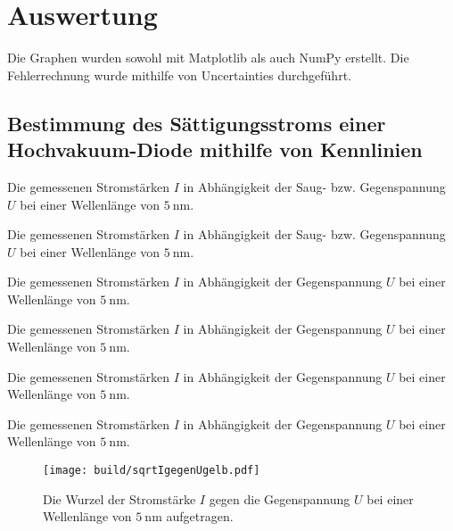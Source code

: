 \section{Auswertung}
\label{sec:Auswertung}

Die Graphen wurden sowohl mit Matplotlib \cite{matplotlib} als auch NumPy \cite{numpy} erstellt. Die
 Fehlerrechnung wurde mithilfe von Uncertainties \cite{uncertainties} durchgeführt. 


 \subsection{Bestimmung des Sättigungsstroms einer Hochvakuum-Diode mithilfe von Kennlinien}

 \begin{table}
 	\centering
 	\caption{Die gemessenen Stromstärken $I$ in Abhängigkeit der Saug- bzw. Gegenspannung $U$ bei einer Wellenlänge von $\SI{5}{\nano\meter}$.}
 	
 \end{table}
 \begin{table}
 	\centering
 	\caption{Die gemessenen Stromstärken $I$ in Abhängigkeit der Saug- bzw. Gegenspannung $U$ bei einer Wellenlänge von $\SI{5}{\nano\meter}$.}
 	
 \end{table}
 \begin{table}
 	\centering
 	\caption{Die gemessenen Stromstärken $I$ in Abhängigkeit der Gegenspannung $U$ bei einer Wellenlänge von $\SI{5}{\nano\meter}$.}
 	
 \end{table}
 \begin{table}
 	\centering
 	\caption{Die gemessenen Stromstärken $I$ in Abhängigkeit der Gegenspannung $U$ bei einer Wellenlänge von $\SI{5}{\nano\meter}$.}
 	
 \end{table}
 \begin{table}
 	\centering
 	\caption{Die gemessenen Stromstärken $I$ in Abhängigkeit der Gegenspannung $U$ bei einer Wellenlänge von $\SI{5}{\nano\meter}$.}
 	
 \end{table}
 \begin{table}
 	\centering
 	\caption{Die gemessenen Stromstärken $I$ in Abhängigkeit der Gegenspannung $U$ bei einer Wellenlänge von $\SI{5}{\nano\meter}$.}
 	
 \end{table}

 
 \begin{figure}
 	\centering
 	\caption{Die Wurzel der Stromstärke $I$ gegen die Gegenspannung $U$ bei einer Wellenlänge von  $\SI{5}{\nano\meter}$ aufgetragen.}
 	\texttt{[image: build/sqrtIgegenUgelb.pdf]}
 	\label{fig:Graphgelb}
 \end{figure}

 